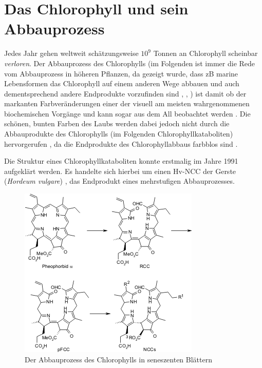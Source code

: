 \chapter{Das Chlorophyll und sein Abbauprozess}

Jedes Jahr gehen weltweit schätzungsweise $10^{9}$ Tonnen an Chlorophyll scheinbar \textit{verloren}. Der Abbauprozess des Chlorophylls (im Folgenden ist immer die Rede vom Abbauprozess in höheren Pflanzen, da gezeigt wurde, dass \gls{zB} marine Lebensformen das Chlorophyll auf einem anderen Wege abbauen und auch dementsprechend andere Endprodukte vorzufinden sind \cite{ChlorophyllBreakdown}, \cite{ErsterKatabolit}, \cite{ChlorophyllCataboliteDifferent}) ist damit ob der markanten Farbveränderungen einer der visuell am meisten wahrgenommenen biochemischen Vorgänge und kann sogar aus dem All beobachtet werden \cite{ChlorophyllBreakdown}. Die schönen, bunten Farben des Laubs werden dabei jedoch nicht durch die Abbauprodukte des Chlorophylls (im Folgenden Chlorophyllkataboliten) hervorgerufen  \cite{DegradationChlorophyll}, da die Endprodukte des Chlorophyllabbaus farbblos sind \cite{ChlorophyllBreakdown}. 

Die Struktur eines Chlorophyllkataboliten konnte erstmalig im Jahre 1991 aufgeklärt werden. Es handelte sich hierbei um einen Hv-\gls{NCC} der Gerste (\textit{Hordeum vulgare}) \cite{ErsterKatabolit}, das Endprodukt eines mehrstufigen Abbauprozesses. 

\begin{figure}[hbtp]
  \centering
  \includegraphics[scale=0.57]{figures/Kapitel2/VWA_Schema_Chlorophyllabbau.png}
  \caption[Abbauprozess des Chlorophylls, Quelle: http://www.organische-chemie.ch/chemie/2007nov/antioxidantien.shtm (Zugegriffen am: 05.11.2017)]{Der Abbauprozess des Chlorophylls in seneszenten Blättern}
  \label{fig:Chlorophyllabbau}
\end{figure}

